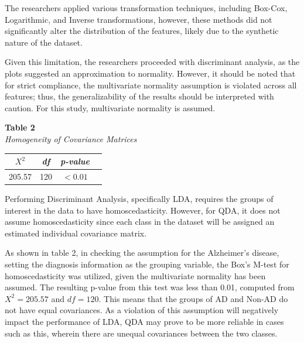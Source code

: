 \documentclass[12pt]{article}
\begin{document}
The researchers applied various transformation techniques, including Box-Cox, Logarithmic, and Inverse transformations, however, these methods did not significantly alter the distribution  of the
features, likely due to the synthetic nature of the dataset. 

Given this limitation, the researchers proceeded with discriminant analysis, as the plots suggested an approximation to normality. However, it should be noted that for strict compliance, the multivariate 
normality assumption is violated across all features; thus, the generalizability of the results should be interpreted with caution. For this study, multivariate normality is assumed.  

\noindent
\textbf{Table 2}\\
\textit{Homogeneity of Covariance Matrices}
\begin{center}
    \begin{tabular}{cccc}
        \hline
        \textit{$X^2$} & \textit{df} & \textit{p-value} \\
        \hline
        205.57 & 120 &  $ < 0.01$ \\
        \hline
    \end{tabular}
\end{center}

Performing Discriminant Analysis, specifically LDA, requires the groups of interest in the data to have homoscedasticity. However, for QDA, it does 
not assume homoscedasticity since each class in the dataset will be assigned an estimated individual covariance matrix. 

As shown in table 2, in checking the assumption for the Alzheimer's disease, setting the diagnosis information as the grouping variable, the Box's M-test
for homoscedasticity was utilized, given the multivariate normality has been assumed. The resulting p-value from this test was less than 0.01, computed from 
$X^{2} = 205.57$ and $df = 120$. This means that the groups of AD and Non-AD do not have equal covariances. As a violation of this assumption will negatively impact 
the performance of LDA, QDA may prove to be more reliable in cases such as this, wherein there are unequal covariances between the two classes.  
\end{document}
